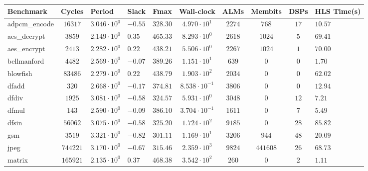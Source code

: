 \begin{tabular}{|l|c|HHc|c|c|c|cH|}
\hline
Benchmark     & Cycles       & Period                 & Slack     & Fmax       & Wall-clock              & ALMs      & Membits    & DSPs    & HLS Time(s) \\
\hline
adpcm\_encode & $ 16317    $ & $ 3.046 \cdot 10^{0} $ & $ -0.55 $ & $ 328.30 $ & $ 4.970 \cdot 10^{1}  $ & $ 2274  $ & $ 768    $ & $ 17  $ & $ 10.57   $ \\
aes\_decrypt  & $ 3859     $ & $ 2.149 \cdot 10^{0} $ & $ 0.35  $ & $ 465.33 $ & $ 8.293 \cdot 10^{0}  $ & $ 2618  $ & $ 1024   $ & $ 5   $ & $ 69.41   $ \\
aes\_encrypt  & $ 2413     $ & $ 2.282 \cdot 10^{0} $ & $ 0.22  $ & $ 438.21 $ & $ 5.506 \cdot 10^{0}  $ & $ 2267  $ & $ 1024   $ & $ 1   $ & $ 70.00   $ \\
bellmanford   & $ 4482     $ & $ 2.569 \cdot 10^{0} $ & $ -0.07 $ & $ 389.26 $ & $ 1.151 \cdot 10^{1}  $ & $ 639   $ & $ 0      $ & $ 0   $ & $ 1.70    $ \\
blowfish      & $ 83486    $ & $ 2.279 \cdot 10^{0} $ & $ 0.22  $ & $ 438.79 $ & $ 1.903 \cdot 10^{2}  $ & $ 2034  $ & $ 0      $ & $ 0   $ & $ 62.02   $ \\
dfadd         & $ 320      $ & $ 2.668 \cdot 10^{0} $ & $ -0.17 $ & $ 374.81 $ & $ 8.538 \cdot 10^{-1} $ & $ 3806  $ & $ 0      $ & $ 0   $ & $ 12.94   $ \\
dfdiv         & $ 1925     $ & $ 3.081 \cdot 10^{0} $ & $ -0.58 $ & $ 324.57 $ & $ 5.931 \cdot 10^{0}  $ & $ 3048  $ & $ 0      $ & $ 12  $ & $ 7.21    $ \\
dfmul         & $ 143      $ & $ 2.590 \cdot 10^{0} $ & $ -0.09 $ & $ 386.10 $ & $ 3.704 \cdot 10^{-1} $ & $ 1611  $ & $ 0      $ & $ 7   $ & $ 5.49    $ \\
dfsin         & $ 56062    $ & $ 3.075 \cdot 10^{0} $ & $ -0.58 $ & $ 325.20 $ & $ 1.724 \cdot 10^{2}  $ & $ 9185  $ & $ 0      $ & $ 28  $ & $ 85.82   $ \\
gsm           & $ 3519     $ & $ 3.321 \cdot 10^{0} $ & $ -0.82 $ & $ 301.11 $ & $ 1.169 \cdot 10^{1}  $ & $ 3206  $ & $ 944    $ & $ 48  $ & $ 20.09   $ \\
jpeg          & $ 744221   $ & $ 3.170 \cdot 10^{0} $ & $ -0.67 $ & $ 315.46 $ & $ 2.359 \cdot 10^{3}  $ & $ 9824  $ & $ 441608 $ & $ 26  $ & $ 68.73   $ \\
matrix        & $ 165921   $ & $ 2.135 \cdot 10^{0} $ & $ 0.37  $ & $ 468.38 $ & $ 3.542 \cdot 10^{2}  $ & $ 260   $ & $ 0      $ & $ 2   $ & $ 1.11    $ \\

\end{tabular}
